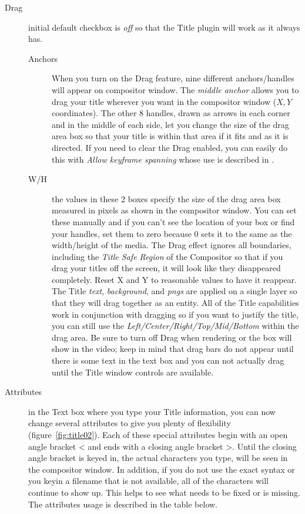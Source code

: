 \begin{description}
    \item[Drag] initial default checkbox is \textit{off} so that the Title plugin will work as it always has.
    \begin{description}
        \item[Anchors] When you turn on the Drag feature, nine different anchors/handles will appear on compositor window. The \textit{middle anchor} allows you to drag your title wherever you want in the compositor window ($X, Y$ coordinates). The other 8 handles, drawn as arrows in each corner and in the middle of each side, let you change the size of the drag area box so that your title is within that area if it fits and as it is directed.  If you need to clear the Drag enabled, you can easily do this with \textit{Allow keyframe spanning} whose use is described in .
        \item[W/H] the values in these 2 boxes specify the size of the drag area box measured in pixels as shown in the compositor window. You can set these manually and if you can't see the location of your box or find your handles, set them to zero because $0$ sets it to the same as the width/height of the media.
        The Drag effect ignores all boundaries, including the \textit{Title Safe Region} of the Compositor so that if you drag your titles off the screen, it will look like they disappeared completely. Reset X and Y to reasonable values to have it reappear. The Title \textit{text}, \textit{background}, and \textit{pngs} are applied on a single layer so that they will drag together as an entity. All of the Title capabilities work in conjunction with dragging so if you want to justify the title, you can still use the \textit{Left/Center/Right/Top/Mid/Bottom} within the drag area. Be sure to turn off Drag when rendering or the box will show in the video; keep in mind that drag bars do not appear until there is some text in the text box and you can not actually drag until the Title window controls are available.
    \end{description}
    \item[Attributes] in the Text box where you type your Title information, you can now change several attributes to give you plenty of flexibility (figure~\ref{fig:title02}). Each of these special attributes begin with an open angle bracket < and ends with a closing angle bracket >. Until the closing angle bracket is keyed in, the actual characters you type, will be seen in the compositor window. In addition, if you do not use the exact syntax or you keyin a filename that is not available, all of the characters will continue to show up. This helps to see what needs to be fixed or is missing. The attributes usage is described in the table below.
\end{description}

